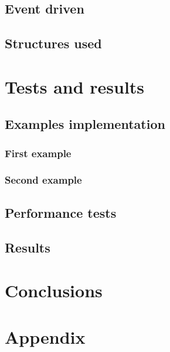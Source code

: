 \documentclass[10pt,a4paper,hidelinks]{article}
\begin{document}
\subsection{Event driven}
\subsection{Structures used}

\section{Tests and results}
\subsection{Examples implementation}
\subsubsection{First example}
\subsubsection{Second example}
\subsection{Performance tests}
\subsection{Results}

\section{Conclusions}
\section{Appendix}


\newpage
\listoffigures
\lstlistoflistings
\listoftables



\end{document}
